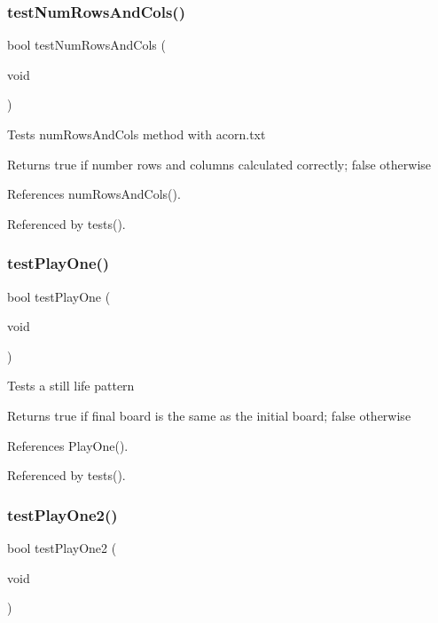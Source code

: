 \subsubsection{test\+Num\+Rows\+And\+Cols()}
{\footnotesize\ttfamily bool test\+Num\+Rows\+And\+Cols (\begin{DoxyParamCaption}\item[{void}]{ }\end{DoxyParamCaption})}

Tests num\+Rows\+And\+Cols method with acorn.\+txt \begin{DoxyReturn}{Returns}
true if number rows and columns calculated correctly; false otherwise 
\end{DoxyReturn}


References num\+Rows\+And\+Cols().



Referenced by tests().

\mbox{\label{tests_8h_aa4c8095a20d90a18d843ab63ecd02d00}} 
\subsubsection{test\+Play\+One()}
{\footnotesize\ttfamily bool test\+Play\+One (\begin{DoxyParamCaption}\item[{void}]{ }\end{DoxyParamCaption})}

Tests a still life pattern \begin{DoxyReturn}{Returns}
true if final board is the same as the initial board; false otherwise 
\end{DoxyReturn}


References Play\+One().



Referenced by tests().

\mbox{\label{tests_8h_a47e8ad22bc283ef5aee41bf4b127abd4}} 
\subsubsection{test\+Play\+One2()}
{\footnotesize\ttfamily bool test\+Play\+One2 (\begin{DoxyParamCaption}\item[{void}]{ }\end{DoxyParamCaption})}

